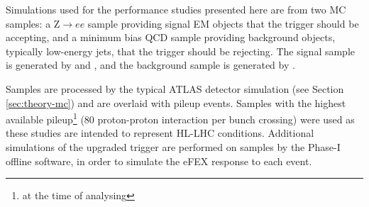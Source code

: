 
Simulations used for the performance studies presented here are from two
\acf{MC} samples: a Z$\to ee$ sample providing signal \ac{EM} objects that the trigger
should be accepting, and a minimum bias \ac{QCD} sample providing background objects,
typically low-energy jets, that the trigger should be rejecting. The signal
sample is generated by 
\powheg \cite{powheg}
and \pythia \cite{pythia8dot1},
and the background sample is generated by \pythia.

Samples are processed by the typical ATLAS detector simulation (see Section
\ref{sec:theory-mc}) and are overlaid with pileup events. Samples with the
highest available pileup\footnote{at the time of analysing} (80 proton-proton
interaction per bunch crossing) were used as these studies are intended to
represent \ac{HL-LHC} conditions.  Additional simulations of the upgraded
trigger are performed on samples by the Phase-I offline software, in order to
simulate the \ac{eFEX} response to each event.
